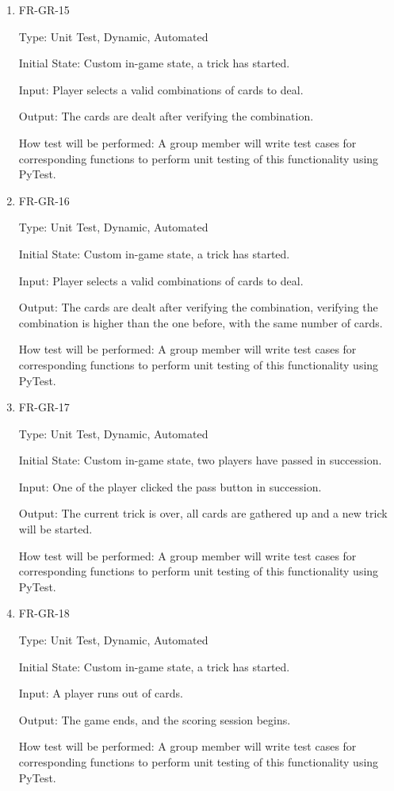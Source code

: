 \documentclass[12pt, titlepage]{article}
\begin{document}
\begin{enumerate}
\item{FR-GR-15\\}

Type: Unit Test, Dynamic, Automated
					
Initial State: Custom in-game state, a trick has started.
					
Input: Player selects a valid combinations of cards to deal.
					
Output: The cards are dealt after verifying the combination.
					
How test will be performed: A group member will write test cases for corresponding functions to perform unit testing of this functionality using PyTest.

\item{FR-GR-16\\}

Type: Unit Test, Dynamic, Automated
					
Initial State: Custom in-game state, a trick has started.
					
Input: Player selects a valid combinations of cards to deal.
					
Output: The cards are dealt after verifying the combination, verifying the combination is higher than the one before, with the same number of cards.
					
How test will be performed: A group member will write test cases for corresponding functions to perform unit testing of this functionality using PyTest.


\item{FR-GR-17\\}

Type: Unit Test, Dynamic, Automated
					
Initial State: Custom in-game state, two players have passed in succession.
					
Input: One of the player clicked the pass button in succession.
					
Output: The current trick is over, all cards are gathered up and a new trick will be started.
					
How test will be performed: A group member will write test cases for corresponding functions to perform unit testing of this functionality using PyTest.

\item{FR-GR-18\\}

Type: Unit Test, Dynamic, Automated
					
Initial State: Custom in-game state, a trick has started.
					
Input: A player runs out of cards.
					
Output: The game ends, and the scoring session begins.
					
How test will be performed: A group member will write test cases for corresponding functions to perform unit testing of this functionality using PyTest.

\end{enumerate}
\end{document}
